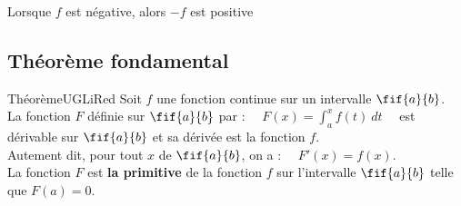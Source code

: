 \documentclass[a4paper,11pt,cours]{nsi} %
\begin{document}
\begin{definition}[]
\begin{enumerate}
\begin{center}
        \end{center}
    \end{enumerate}
\end{definition}

\begin{remarque}[]
    Lorsque $f$ est négative, alors $-f$ est positive
\end{remarque}

\subsection*{Théorème fondamental}

\begin{encadrecolore}{Théorème}{UGLiRed}
    Soit $f$ une fonction continue sur un intervalle $\fif{a}{b}$.\\
    La fonction $F$ définie sur $\fif{a}{b}$ par : $\displaystyle \quad F(x)=\int_a^x f(t) \ dt\quad$ est dérivable sur $\fif{a}{b}$ et sa dérivée est la fonction $f$.\\
    Autement dit, pour tout $x$ de $\fif{a}{b}$, on a : $\quad F'(x)=f(x)$.\\
    La fonction $F$ est \textbf{la primitive} de la fonction $f$ sur l'intervalle $\fif{a}{b}$ telle que $F(a)=0$.
\end{encadrecolore}
\end{document}
